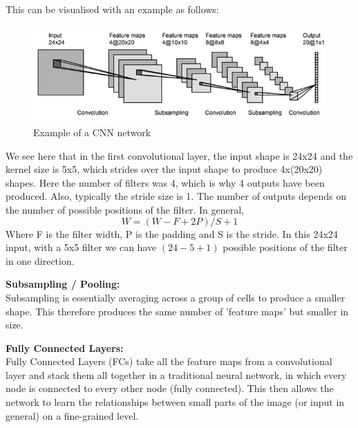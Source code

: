 \documentclass[12pt,a4paper,twoside]{report}
\begin{document}
This can be visualised with an example as follows:\\

\begin{figure}[H]

\centering
\includegraphics[width=\textwidth]{CNN-Example}
\caption{Example of a CNN network}
\end{figure}

We see here that in the first convolutional layer, the input shape is 24x24 and the kernel size is 5x5, which strides over the input shape to produce 4x(20x20) shapes. Here the number of filters was 4, which is why 4 outputs have been produced. Also, typically the stride size is 1. The number of outputs depends on the number of possible positions of the filter. In general, $$W=(W-F+2P)/S+1$$ Where F is the filter width, P is the padding and S is the stride. In this 24x24 input, with a 5x5 filter we can have $(24-5+1)$ possible positions of the filter in one direction. 

\textbf{Subsampling / Pooling:}\\
Subsampling is essentially averaging across a group of cells to produce a smaller shape. This therefore produces the same number of 'feature maps' but smaller in size. 

\textbf{Fully Connected Layers:}\\
Fully Connected Layers (FCs) take all the feature maps from a convolutional layer and stack them all together in a traditional neural network, in which every node is connected to every other node (fully connected). This then allows the network to learn the relationships between small parts of the image (or input in general) on a fine-grained level. 
\end{document}
